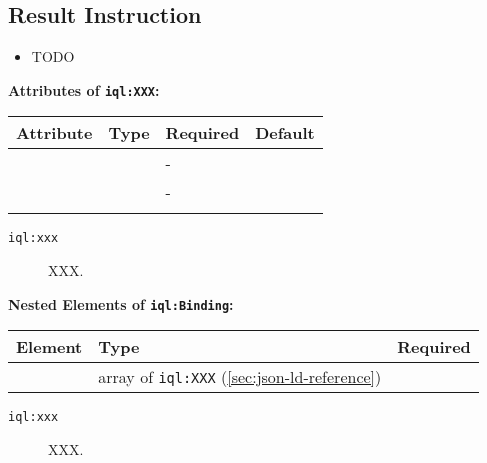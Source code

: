 \documentclass[11pt]{article}
\newcommand{\iqlns}{iql:}
\newcommand{\iqlType}[1]{\texttt{\iqlns#1}}
\newcommand{\attributes}[1]{\noindent\textbf{Attributes of \iqlType{#1}:}\newline\medskip}
\newcommand{\elements}[1]{\noindent\textbf{Nested Elements of \iqlType{#1}:}\newline\medskip}
\begin{document}
\subsection{Result Instruction}
\label{sec:json-ld-result-instruction}
\begin{itemize}
\item TODO
\end{itemize}
\attributes{XXX}
\begin{tabular}{|p{}|p{}|p{}|p{}|}
	\hline
	\textbf{Attribute} & \textbf{Type} & \textbf{Required} & \textbf{Default} \\ 
	\hline
	\hline
	&  & - &  \\ 
	\hline 
	&  & - &  \\ 
	\hline 
	&  &  & \\ 
	\hline 
\end{tabular}
\begin{description}
	\item[\iqlType{xxx}] XXX.
\end{description}
\elements{Binding}
\begin{tabular}{|p{}|p{}|p{}|}
	\hline
	\textbf{Element} & \textbf{Type} & \textbf{Required} \\ 
	\hline
	\hline 
	& array of \iqlType{XXX} (\ref{sec:json-ld-reference}) &  \\ 
	\hline 
\end{tabular}
\begin{description}
	\item[\iqlType{xxx}] XXX.
\end{description}

\end{document}
